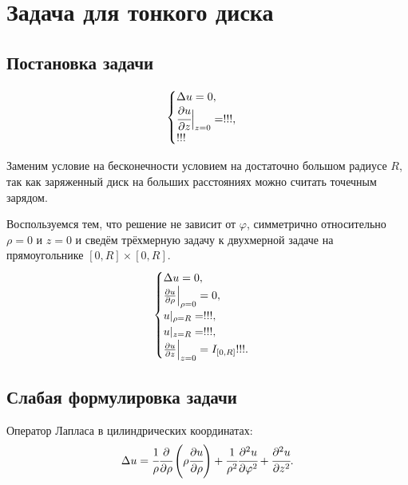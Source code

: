 \documentclass{report}
\begin{document}
\chapter{Задача для тонкого диска}
\section{Постановка задачи}
\begin{equation}
	\begin{cases}
		\Delta u = 0,\\
		\cfrac{\partial u}{\partial z}\Bigr|_{z=0}=!!!,\\
		!!!
	\end{cases}
\end{equation}

Заменим условие на бесконечности условием на достаточно большом радиусе $R$, так как заряженный диск на больших расстояниях можно считать точечным зарядом.

Воспользуемся тем, что решение не зависит от $\varphi$, симметрично относительно $\rho=0$ и $z=0$ и сведём трёхмерную задачу к двухмерной задаче на прямоугольнике $[0, R]\times[0,R]$.
\begin{equation}\label{disk_problem}
	\begin{cases}
		\Delta u = 0,\\
		\pdv{u}{\rho}\Bigr|_{\rho=0}=0,\\
		u|_{\rho=R}=!!!,\\
		u|_{z=R}=!!!,\\
		\pdv{u}{z}\Bigr|_{z=0}=I_{[0,R]}!!!.
	\end{cases}
\end{equation}

\section{Слабая формулировка задачи}
Оператор Лапласа в цилиндрических координатах:
\begin{equation}
	\Delta u = \cfrac{1}{\rho}\cfrac{\partial}{\partial \rho}\left(\rho\cfrac{\partial u}{\partial \rho}\right) + \cfrac{1}{\rho^2}\cfrac{\partial^2u}{\partial \varphi^2}+\cfrac{\partial^2u}{\partial z^2}.
\end{equation}
\end{document}
